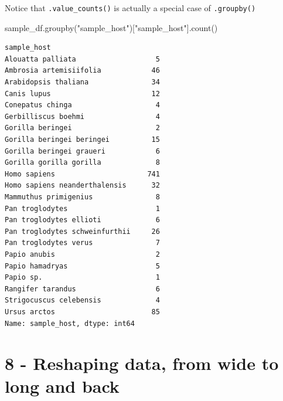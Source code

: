 \documentclass[
  letterpaper,
]{book}
\newenvironment{Shaded}{}{}
\newcommand{\NormalTok}[1]{\textcolor[rgb]{0.14,0.16,0.18}{#1}}
\newcommand{\StringTok}[1]{\textcolor[rgb]{0.01,0.18,0.38}{#1}}
\begin{document}
Notice that \texttt{.value\_counts()} is actually a special case of
\texttt{.groupby()}

\begin{Shaded}
\begin{Highlighting}[]
\NormalTok{sample\_df.groupby(}\StringTok{"sample\_host"}\NormalTok{)[}\StringTok{"sample\_host"}\NormalTok{].count()}
\end{Highlighting}
\end{Shaded}

\begin{verbatim}
sample_host
Alouatta palliata                   5
Ambrosia artemisiifolia            46
Arabidopsis thaliana               34
Canis lupus                        12
Conepatus chinga                    4
Gerbilliscus boehmi                 4
Gorilla beringei                    2
Gorilla beringei beringei          15
Gorilla beringei graueri            6
Gorilla gorilla gorilla             8
Homo sapiens                      741
Homo sapiens neanderthalensis      32
Mammuthus primigenius               8
Pan troglodytes                     1
Pan troglodytes ellioti             6
Pan troglodytes schweinfurthii     26
Pan troglodytes verus               7
Papio anubis                        2
Papio hamadryas                     5
Papio sp.                           1
Rangifer tarandus                   6
Strigocuscus celebensis             4
Ursus arctos                       85
Name: sample_host, dtype: int64
\end{verbatim}

\hypertarget{reshaping-data-from-wide-to-long-and-back}{%
\section{8 - Reshaping data, from wide to long and
back}\label{reshaping-data-from-wide-to-long-and-back}}
\end{document}
